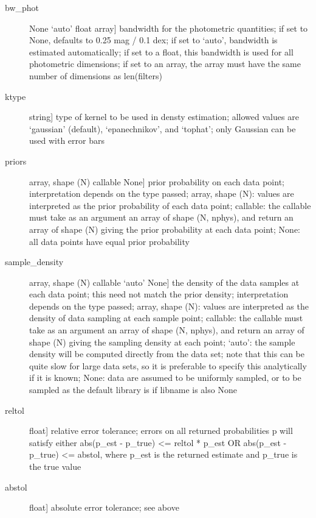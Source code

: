 \documentclass[letterpaper,10pt,english]{sphinxmanual}
\begin{document}
\begin{fulllineitems}
\begin{fulllineitems}
\begin{description}
\begin{description}
\item[{bw\_phot}] \leavevmode{[}None \textbar{} `auto' \textbar{} float \textbar{} array{]}
bandwidth for the photometric quantities; if set to
None, defaults to 0.25 mag / 0.1 dex; if set to `auto',
bandwidth is estimated automatically; if set to a float,
this bandwidth is used for all photometric dimensions;
if set to an array, the array must have the same number
of dimensions as len(filters)

\item[{ktype}] \leavevmode{[}string{]}
type of kernel to be used in densty estimation; allowed
values are `gaussian' (default), `epanechnikov', and
`tophat'; only Gaussian can be used with error bars

\item[{priors}] \leavevmode{[}array, shape (N) \textbar{} callable \textbar{} None{]}
prior probability on each data point; interpretation
depends on the type passed; array, shape (N): values are
interpreted as the prior probability of each data point;
callable: the callable must take as an argument an array
of shape (N, nphys), and return an array of shape (N)
giving the prior probability at each data point; None:
all data points have equal prior probability

\item[{sample\_density}] \leavevmode{[}array, shape (N) \textbar{} callable \textbar{} `auto' \textbar{} None{]}
the density of the data samples at each data point; this
need not match the prior density; interpretation depends
on the type passed; array, shape (N): values are
interpreted as the density of data sampling at each
sample point; callable: the callable must take as an
argument an array of shape (N, nphys), and return an
array of shape (N) giving the sampling density at each
point; `auto': the sample density will be computed
directly from the data set; note that this can be quite
slow for large data sets, so it is preferable to specify
this analytically if it is known; None: data are assumed
to be uniformly sampled, or to be sampled as the default
library is if libname is also None

\item[{reltol}] \leavevmode{[}float{]}
relative error tolerance; errors on all returned
probabilities p will satisfy either
abs(p\_est - p\_true) \textless{}= reltol * p\_est   OR
abs(p\_est - p\_true) \textless{}= abstol,
where p\_est is the returned estimate and p\_true is the
true value

\item[{abstol}] \leavevmode{[}float{]}
absolute error tolerance; see above


\end{description}
\end{description}
\end{fulllineitems}
\end{fulllineitems}
\end{document}
